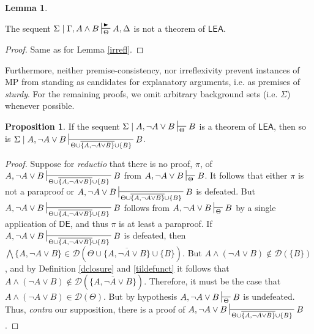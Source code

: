 \documentclass{article}
\theoremstyle{definition}
\theoremstyle{definition}
\theoremstyle{definition}
\newtheorem{lemma}{Lemma}
\theoremstyle{definition}
\theoremstyle{remark}
\theoremstyle{definition}
\newtheorem{proposition}{Proposition}
\theoremstyle{definition}
\begin{document}
\begin{lemma}\label{part_irreflex}
	
	The sequent $ \Sigma\mid \Gamma, A \wedge B \sststile{\Theta}{\RHD}  A, \Delta $ is not a theorem of $ \mathsf{LEA}$.
	
	\begin{proof}
		Same as for Lemma \ref{irrefl}.
	\end{proof}
\end{lemma}

Furthermore, neither premise-consistency, nor irreflexivity prevent instances of \textsf{MP} from standing as candidates for explanatory arguments, i.e. as premises of \textit{sturdy}. For the remaining proofs, we omit arbitrary background sets (i.e. $ \Sigma $) whenever possible.


\begin{proposition}
	If the sequent $ \Sigma\mid A, \neg A \vee B \sststile{\Theta}{}  B $ is a theorem of $ \mathsf{LEA}$, then so is $ \Sigma\mid A, \neg A \vee B \sststile{\Theta\cup\overline{\{ A, \neg A \vee B  \}}\cup\{B\}}{}  B $.
	
	\begin{proof}
		Suppose for \textit{reductio} that there is no proof, $ \pi $, of $  A, \neg A \vee B \sststile{\Theta\cup\overline{\{ A, \neg A \vee B  \}}\cup\{B\}}{}  B $ from $ A, \neg A \vee B \sststile{\Theta}{}  B $. It follows that either $ \pi $ is not a paraproof or $ A, \neg A \vee B \sststile{\Theta\cup\overline{\{ A, \neg A \vee B  \}}\cup\{B\}}{}  B $ is defeated. But $  A, \neg A \vee B \sststile{\Theta\cup\overline{\{ A, \neg A \vee B  \}}\cup\{B\}}{}  B $ follows from $  A, \neg A \vee B \sststile{\Theta}{}  B $ by a single application of $ \mathsf{DE} $, and thus $ \pi $ is at least a paraproof. If $  A, \neg A \vee B \sststile{\Theta\cup\overline{\{ A, \neg A \vee B  \}}\cup\{B\}}{}  B $ is defeated, then $ \bigwedge \{A, \neg A \vee B\} \in \mathcal{D}(\Theta\cup\overline{\{ A, \neg A \vee B  \}}\cup\{B\})$. But  $ A \wedge (\neg A \vee B) \not\in \mathcal{D}(\{B\})$, and by Definition \ref{dclosure} and \ref{tildefunct} it follows that $ A \wedge (\neg A \vee B) \not\in \mathcal{D}(\overline{\{ A, \neg A \vee B  \}})$. Therefore, it must be the case that $ A \wedge (\neg A \vee B) \in\mathcal{D}(\Theta)$. But by hypothesis $  A, \neg A \vee B \sststile{\Theta}{}  B $ is undefeated. Thus, \textit{contra} our supposition, there is a proof of $ A, \neg A \vee B \sststile{\Theta\cup\overline{\{ A, \neg A \vee B  \}}\cup\{B\}}{}  B $.
	\end{proof}
\end{proposition}
\end{document}
